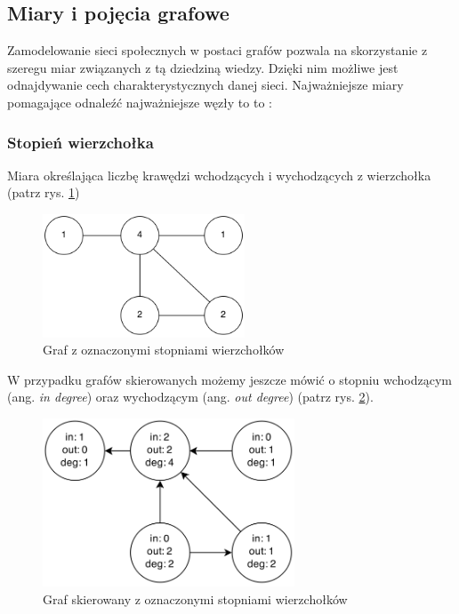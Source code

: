 \subsection{Miary i pojęcia grafowe}
Zamodelowanie sieci społecznych w postaci grafów pozwala na skorzystanie z szeregu
miar związanych z tą dziedziną wiedzy. Dzięki nim możliwe jest odnajdywanie cech
charakterystycznych danej sieci. Najważniejsze miary pomagające odnaleźć najważniejsze
węzły to to \cite{estrada}: 


\subsubsection{Stopień wierzchołka}
Miara określająca liczbę krawędzi wchodzących i 
  wychodzących z wierzchołka (patrz rys. \ref{image:stopien-wierzcholka})
  
\begin{figure}[ht!]
\centering
\includegraphics[width=60mm]{img/stopien-wierzcholka.png}
\caption{Graf z oznaczonymi stopniami wierzchołków}
\label{image:stopien-wierzcholka}
\end{figure}

W przypadku grafów skierowanych możemy jeszcze mówić o stopniu wchodzącym 
(ang. \textit{in degree}) oraz wychodzącym (ang. \textit{out degree}) 
(patrz rys. \ref{image:stopien-wierzcholka-skierowany}).
  
\begin{figure}[ht!]
\centering
\includegraphics[width=75mm]{img/stopien-wierzcholka-skierowany.png}
\caption{Graf skierowany z oznaczonymi stopniami wierzchołków}
\label{image:stopien-wierzcholka-skierowany}
\end{figure}
  
